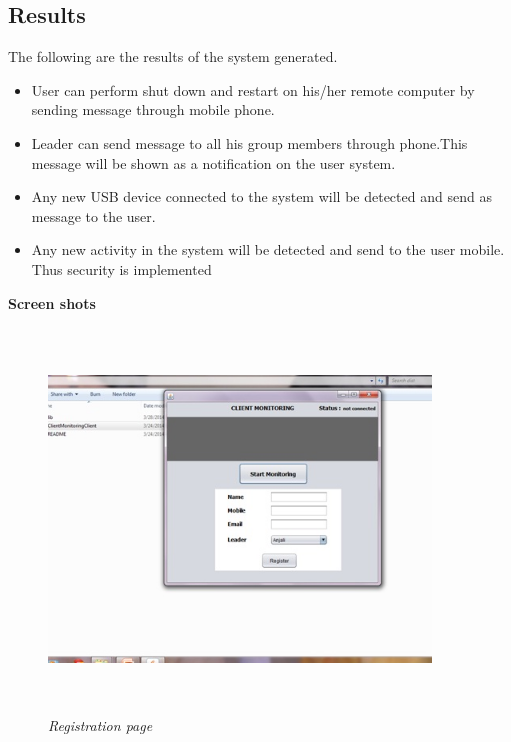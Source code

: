 \begin{center}
\section{Results}
\end{center}
The following are the results of the system generated.
\begin{itemize}
\item User can perform shut down and restart on his/her remote computer by sending message through mobile phone.
\item Leader can send message to all his group members through phone.This message will be shown as a notification on the user system.
\item Any new USB device connected to the system will be detected and send as message to the user.
\item Any new activity in the system will be detected and send to the user mobile. Thus security is implemented 
\end{itemize}
\textbf{Screen shots}

\begin{figure}[h!]
\centering
\includegraphics[height=4in, width = 4in]{first.jpg}
\caption{\emph{Registration page}}
\label{fig:1}
\end{figure}

